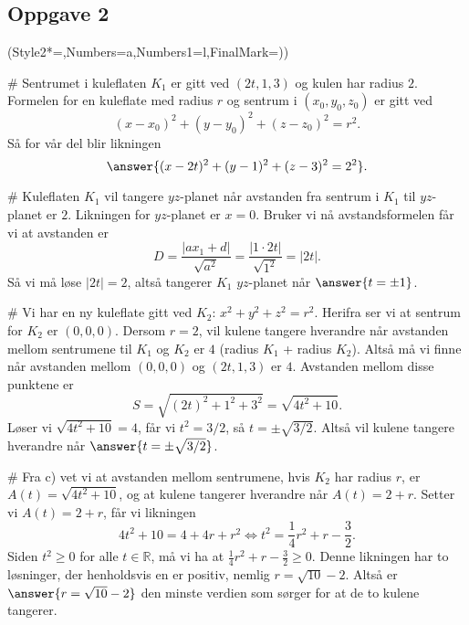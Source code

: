 \subsection*{Oppgave 2}
\begin{easylist}[enumerate]
	\ListProperties(Style2*=,Numbers=a,Numbers1=l,FinalMark={)})

	# Sentrumet i kuleflaten $K_1$ er gitt ved $(2t,1,3)$ og kulen har radius $2$.
	Formelen for en kuleflate med radius $r$ og sentrum i $(x_0,y_0,z_0)$ er gitt ved
	\begin{equation*}
	(x-x_0)^2+(y-y_0)^2+(z-z_0)^2=r^2.
	\end{equation*}
	Så for vår del blir likningen
	\begin{equation*}
	\answer{(x-2t)^2+(y-1)^2+(z-3)^2=2^2}.
	\end{equation*}

	# Kuleflaten $K_1$ vil tangere $yz$-planet når avstanden fra sentrum i $K_1$ til $yz$-planet er $2$.
	Likningen for $yz$-planet er $x=0$.
	Bruker vi nå avstandsformelen får vi at avstanden er
	\begin{equation*}
	D=\frac{|ax_1+d|}{\sqrt{a^2}} = \frac{|1\cdot2t|}{\sqrt{1^2}}=|2t|.
	\end{equation*}
	Så vi må løse $|2t|=2$, altså tangerer $K_1$ $yz$-planet når $\answer{t=\pm1}$.

	# Vi har en ny kuleflate gitt ved $K_2:\, x^2+y^2+z^2=r^2$.
	Herifra ser vi at sentrum for $K_2$ er $(0,0,0)$.
	Dersom $r=2$, vil kulene tangere hverandre når avstanden mellom sentrumene til $K_1$ og $K_2$ er $4$ (radius $K_1$ + radius $K_2$).
	Altså må vi finne når avstanden mellom $(0,0,0)$ og $(2t,1,3)$ er $4$.
	Avstanden mellom disse punktene er
	\begin{equation*}
	S=\sqrt{(2t)^2+1^2+3^2}=\sqrt{4t^2+10}.
	\end{equation*}
	Løser vi $\sqrt{4t^2+10}=4$, får vi $t^2= 3 / 2$, så $t=\pm \sqrt{3 / 2}$. Altså vil kulene tangere hverandre når $\answer{t= \pm \sqrt{3/2}}$.


	# Fra c) vet vi at avstanden mellom sentrumene, hvis $K_2$ har radius $r$, er $A(t)=\sqrt{4t^2+10}$, og at kulene tangerer hverandre når $A(t)=2+r$.
	Setter vi $A(t)=2+r$, får vi likningen
	\begin{equation*}
	4t^2+10=4+4r+r^2 \Longleftrightarrow t^2 = \frac14r^2+r-\frac{3}{2}.
	\end{equation*}
	Siden $t^2\geq0$ for alle $t \in \mathbb{R}$, må vi ha at $\frac14r^2+r-\frac{3}{2}\geq0$.
	Denne likningen har to løsninger, der henholdsvis en er positiv, nemlig $r=\sqrt{10}-2$.
	Altså er $\answer{r=\sqrt{10}-2}$ den minste verdien som sørger for at de to kulene tangerer.
\end{easylist}


